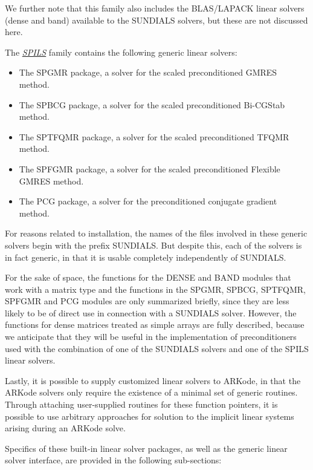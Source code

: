 \documentclass[letterpaper,10pt,english]{sphinxmanual}
\begin{document}
We further note that this family also includes the BLAS/LAPACK linear
solvers (dense and band) available to the SUNDIALS solvers, but these
are not discussed here.

The {\hyperref[linear_solvers/SPILS:linearsolvers-spils]{\emph{SPILS}}} family contains the following
generic linear solvers:
\begin{itemize}
\item {} 
The SPGMR package, a solver for the scaled preconditioned GMRES
method.

\item {} 
The SPBCG package, a solver for the scaled preconditioned Bi-CGStab
method.

\item {} 
The SPTFQMR package, a solver for the scaled preconditioned TFQMR
method.

\item {} 
The SPFGMR package, a solver for the scaled preconditioned Flexible
GMRES method.

\item {} 
The PCG package, a solver for the preconditioned conjugate gradient
method.

\end{itemize}

For reasons related to installation, the names of the files involved
in these generic solvers begin with the prefix SUNDIALS. But despite
this, each of the solvers is in fact generic, in that it is usable
completely independently of SUNDIALS.

For the sake of space, the functions for the DENSE and BAND modules
that work with a matrix type and the functions in the SPGMR, SPBCG,
SPTFQMR, SPFGMR and PCG modules are only summarized briefly, since
they are less likely to be of direct use in connection with a SUNDIALS
solver.  However, the functions for dense matrices treated as simple
arrays are fully described, because we anticipate that they will be
useful in the implementation of preconditioners used with the
combination of one of the SUNDIALS solvers and one of the SPILS linear
solvers.

Lastly, it is possible to supply customized linear solvers to ARKode,
in that the ARKode solvers only require the existence of a minimal set
of generic routines.  Through attaching user-supplied routines for
these function pointers, it is possible to use arbitrary approaches
for solution to the implicit linear systems arising during an ARKode
solve.

Specifics of these built-in linear solver packages, as well as the
generic linear solver interface, are provided in the following
sub-sections:
\end{document}
